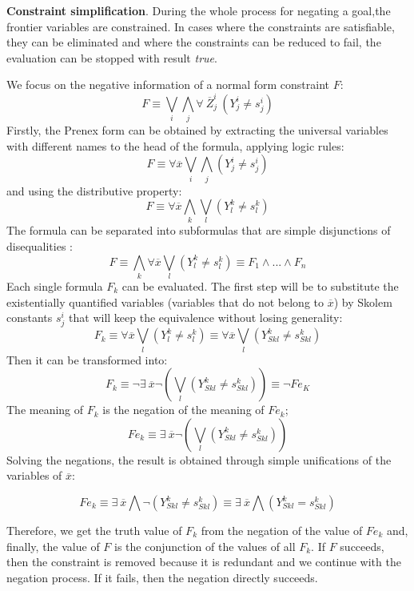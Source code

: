 \documentclass{llncs}
\begin{document}
\noindent
{\bf Constraint simplification}. During the whole process for negating
a goal,the frontier variables are constrained. In cases where the
constraints are satisfiable, they can be eliminated and where the
constraints can be reduced to fail, the evaluation can be stopped with
result \emph{true}.
 
We focus on the negative information of a normal form constraint $F$:
\[ F \equiv  \bigvee_i\bigwedge_j \forall~ \overline{Z}_j^i~(Y_j^i \neq s_j^i) \]
Firstly, the Prenex form \cite{Shoenfield} can be obtained by
extracting the universal variables with different names to the head of
the formula, applying logic rules:
\[ F \equiv \forall \overline{x} \bigvee_i\bigwedge_j (Y_j^i \neq s_j^i) \]
\noindent
and using the distributive property:
\[ F \equiv \forall \overline{x} \bigwedge_k\bigvee_l (Y_l^k \neq s_l^k) \]
The formula can be separated into subformulas that are simple
disjunctions of disequalities :
\[ F \equiv \bigwedge_k \forall \overline{x} \bigvee_l (Y_l^k \neq s_l^k) \equiv F_1 \wedge ... \wedge F_n\]
Each single formula $F_k$ can be evaluated. The first step will be to
substitute the existentially quantified variables (variables that do not
belong to $\overline{x}$) by Skolem constants $s^i_j$ that will keep
the equivalence without losing generality:
\[ F_k \equiv \forall \overline{x} \bigvee_l ( Y_l^k \neq s_l^k ) \equiv \forall \overline{x} \bigvee_l ( Y_{Sk l}^k \neq s_{Sk l}^k )  \]
Then it can be transformed into:
\[ F_k \equiv  \neg \exists ~ \overline{x} \neg ( \bigvee_l (Y_{Sk l}^k \neq s_{Sk l}^k) ) \equiv \neg Fe_K \]
The meaning of $F_k$ is the negation of the meaning of $Fe_k$;
\[ Fe_k \equiv \exists ~ \overline{x} \neg ( \bigvee_l (Y_{Sk l}^k \neq s_{Sk l}^k)) \] 
Solving the negations, the result is obtained through simple unifications of the variables of $\overline{x}$:

\[ Fe_k  \equiv \exists ~ \overline{x} \bigwedge \neg (Y_{Sk l}^k \neq s_{Sk l}^k)  \equiv \exists ~ \overline{x} \bigwedge (Y_{Sk l}^k = s_{Sk l}^k)  \]

        Therefore, we get the truth value of $F_k$ from the
        negation of the value of $Fe_k$ and, finally, the value of $F$ is
        the conjunction of the values of all $F_k$. If $F$
        succeeds, then the constraint is removed because it is redundant
        and we continue with the negation process. If it fails, then
        the negation directly succeeds.

\end{document}
